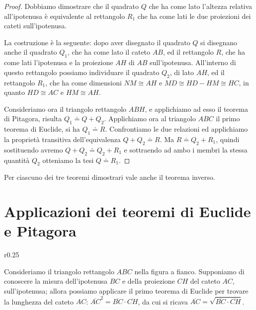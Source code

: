 \noindent\begin{minipage}{0.6\textwidth}\parindent15pt
\begin{proof}
Dobbiamo dimostrare che il quadrato $Q$ che ha come lato l'altezza 
relativa all'ipotenusa è equivalente al rettangolo $R_1$ che ha come 
lati le due proiezioni dei cateti sull'ipotenusa.

La costruzione è la seguente: dopo aver disegnato il quadrato $Q$ si 
disegnano anche il quadrato $Q_1$, che ha come lato il cateto $AB$, 
ed il rettangolo $R$, che ha come lati l'ipotenusa e la proiezione 
$AH$ di $AB$ sull'ipotenusa. All'interno di questo rettangolo 
possiamo individuare il quadrato $Q_2$, di lato $AH$, ed il rettangolo 
$R_1$, che ha come dimensioni $NM\cong AH$ e $MD\cong HD-HM\cong HC$, 
in quanto $HD\cong AC$ e $HM\cong AH$.

Consideriamo ora il triangolo rettangolo $ABH$, e applichiamo ad esso 
il teorema di Pitagora, risulta $Q_1\doteq Q+Q_2$. Applichiamo ora al 
triangolo $ABC$ il primo teorema di Euclide, si ha $Q_1\doteq R$. 
Confrontiamo le due relazioni ed applichiamo la proprietà transitiva 
dell'equivalenza $Q+Q_2\doteq R$. Ma $R\doteq Q_2 + R_1$, quindi 
sostituendo avremo $Q+Q_2\doteq Q_2 + R_1$ e sottraendo ad ambo i 
membri la stessa quantità $Q_2$ otteniamo la tesi $Q\doteq R_1$.
\end{proof}
\end{minipage}\hfil
\begin{minipage}{0.4\textwidth}
	\centering
\end{minipage}\vspace{8pt}

Per ciascuno dei tre teoremi dimostrari vale anche il teorema inverso.

\section{Applicazioni dei teoremi di Euclide e 
Pitagora}\label{sect:applicazioni_pitagora_euclide}

\begin{wrapfigure}{r}{0.25\textwidth}
	\centering
\end{wrapfigure}
Consideriamo il triangolo rettangolo $ABC$ nella figura a fianco.
Supponiamo di conoscere la misura dell'ipotenusa $BC$ e della 
proiezione $CH$ del cateto $AC$, sull'ipotenusa; allora possiamo 
applicare il primo teorema di Euclide per trovare la lunghezza del 
cateto $AC$: $\overline{AC}^2=\overline{BC}\cdot \overline{CH}$, da 
cui si ricava $\overline{AC}=\sqrt{\overline{BC}\cdot \overline{CH}}$.

